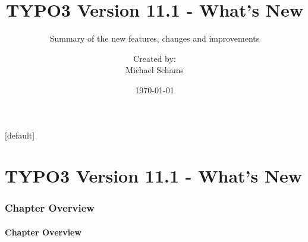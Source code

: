 \documentclass[t]{beamer}
\title{TYPO3 Version 11.1 - What's New}
\subtitle{Summary of the new features, changes and improvements}
\author{
	\centerline{Created by:}
	\centerline{Michael Schams}
}
\date{\today}
\begin{document}
\sharefont


\begingroup
	[default]
	\begin{frame}
		\titlepage
	\end{frame}
\endgroup


\section*{TYPO3 Version 11.1 - What's New}
\begin{frame}[fragile]
	\frametitle{Chapter Overview}
	\framesubtitle{Chapter Overview}

	\tableofcontents

\end{frame}

















\end{document}
